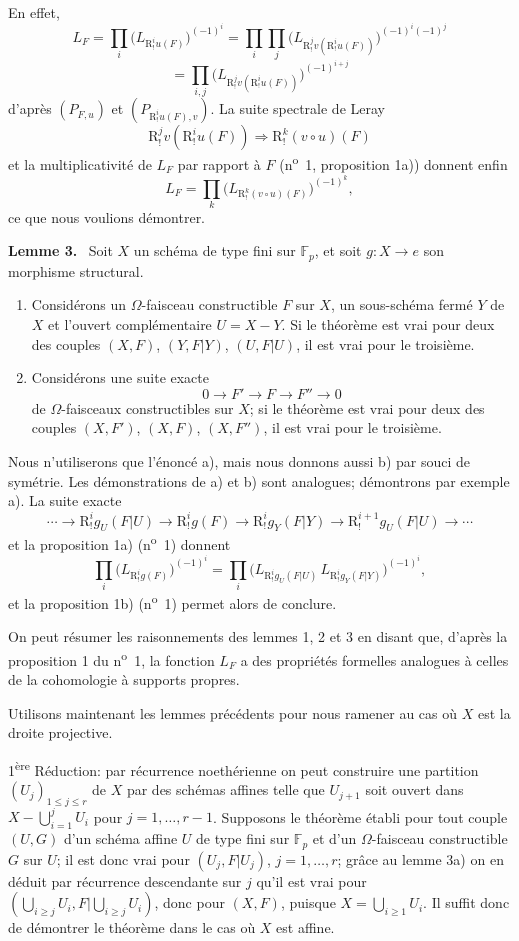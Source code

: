 \documentclass[11pt]{article}
\newenvironment{statement}[1]{\par\medskip\noindent\textbf{#1.}\ }{\par\medskip}
\newcommand{\R}{\mathrm{R}}\newcommand{\RHomCore}{\mathrm{RHom}}
\providecommand{\R}{\mathrm R}
\begin{document}
En effet,
\[
L_F=\prod_i\bigl(L_{\R^i_!u(F)}\bigr)^{(-1)^i}
 =\prod_i\prod_j\bigl(L_{\R^j_!v(\R^i_!u(F))}\bigr)^{(-1)^i(-1)^j}
\]
\[
=\prod_{i,j}\bigl(L_{\R^j_!v(\R^i_!u(F))}\bigr)^{(-1)^{i+j}}
\]
d'après $(P_{F,u})$ et $(P_{\R^i_!u(F),v})$. La suite spectrale de Leray
\[
\R^j_!v(\R^i_!u(F))\Longrightarrow \R^k_!(v\circ u)(F)
\]
et la multiplicativité de $L_F$ par rapport à $F$ (n\textsuperscript{o}~1, proposition 1a)) donnent enfin
\[
L_F=\prod_k\bigl(L_{\R^k_!(v\circ u)(F)}\bigr)^{(-1)^k},
\]
ce que nous voulions démontrer.

\begin{statement}{Lemme 3}
Soit $X$ un schéma de type fini sur $\mathbb F_p$, et soit $g:X\to e$ son morphisme structural.
\begin{enumerate}[label=\alph*)]
\item Considérons un $\Omega$-faisceau constructible $F$ sur $X$, un sous-schéma fermé $Y$ de $X$ et l'ouvert complémentaire $U=X-Y$. Si le théorème est vrai pour deux des couples $(X,F)$, $(Y,F|Y)$, $(U,F|U)$, il est vrai pour le troisième.
\item Considérons une suite exacte
\[
0\longrightarrow F'\longrightarrow F\longrightarrow F''\longrightarrow0
\]
de $\Omega$-faisceaux constructibles sur $X$; si le théorème est vrai pour deux des couples $(X,F')$, $(X,F)$, $(X,F'')$, il est vrai pour le troisième.
\end{enumerate}
\end{statement}

Nous n'utiliserons que l'énoncé a), mais nous donnons aussi b) par souci de symétrie. Les démonstrations de a) et b) sont analogues; démontrons par exemple a). La suite exacte
\[
\cdots\longrightarrow \R^i_!g_U(F|U)\longrightarrow \R^i_!g(F)
\longrightarrow \R^i_!g_Y(F|Y)\longrightarrow \R^{i+1}_!g_U(F|U)\longrightarrow\cdots
\]
et la proposition 1a) (n\textsuperscript{o}~1) donnent
\[
\prod_i\bigl(L_{\R^i_!g(F)}\bigr)^{(-1)^i}
=\prod_i\bigl(L_{\R^i_!g_U(F|U)}\,L_{\R^i_!g_Y(F|Y)}\bigr)^{(-1)^i},
\]
et la proposition 1b) (n\textsuperscript{o}~1) permet alors de conclure.

On peut résumer les raisonnements des lemmes 1, 2 et 3 en disant que, d'après la proposition 1 du n\textsuperscript{o}~1, la fonction $L_F$ a des propriétés formelles analogues à celles de la cohomologie à supports propres.

Utilisons maintenant les lemmes précédents pour nous ramener au cas où $X$ est la droite projective.

1\textsuperscript{ère} Réduction: par récurrence noethérienne on peut construire une partition $(U_j)_{1\le j\le r}$ de $X$ par des schémas affines telle que $U_{j+1}$ soit ouvert dans $X-\bigcup_{i=1}^jU_i$ pour $j=1,\ldots,r-1$. Supposons le théorème établi pour tout couple $(U,G)$ d'un schéma affine $U$ de type fini sur $\mathbb F_p$ et d'un $\Omega$-faisceau constructible $G$ sur $U$; il est donc vrai pour $(U_j,F|U_j)$, $j=1,\ldots,r$; grâce au lemme 3a) on en déduit par récurrence descendante sur $j$ qu'il est vrai pour $(\bigcup_{i\ge j}U_i,F|\bigcup_{i\ge j}U_i)$, donc pour $(X,F)$, puisque $X=\bigcup_{i\ge1}U_i$. Il suffit donc de démontrer le théorème dans le cas où $X$ est affine.
\end{document}
